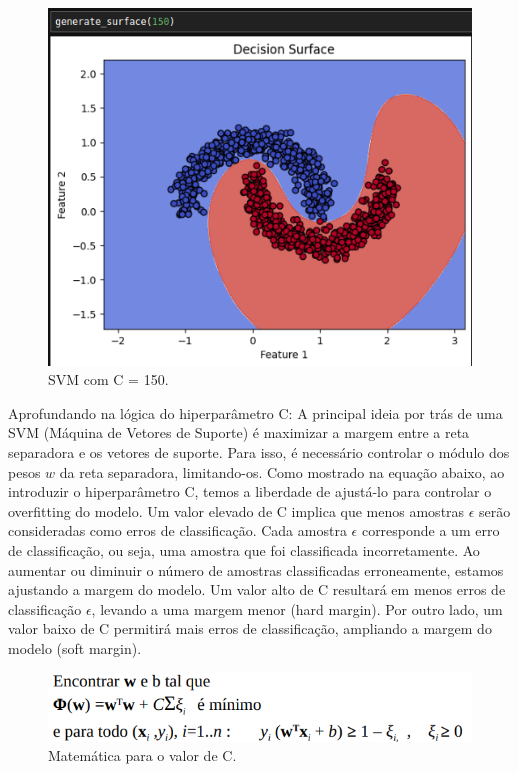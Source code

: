 \documentclass{article} %
\begin{document}
\vspace{1cm}

\begin{figure}[h] %
    \centering %
    \includegraphics[width=0.5\linewidth]{svm_c_150.png} %
    \caption{SVM com C = 150.} %
    \label{fig:exemplo} %
\end{figure}

\vspace{1cm}

Aprofundando na lógica do hiperparâmetro C: A principal ideia por trás de uma SVM (Máquina de Vetores de Suporte) é maximizar a margem entre a reta separadora e os vetores de suporte. Para isso, é necessário controlar o módulo dos pesos \( w \) da reta separadora, limitando-os. Como mostrado na equação abaixo, ao introduzir o hiperparâmetro C, temos a liberdade de ajustá-lo para controlar o overfitting do modelo. Um valor elevado de C implica que menos amostras \( \epsilon \) serão consideradas como erros de classificação. Cada amostra \( \epsilon \) corresponde a um erro de classificação, ou seja, uma amostra que foi classificada incorretamente. Ao aumentar ou diminuir o número de amostras classificadas erroneamente, estamos ajustando a margem do modelo. Um valor alto de C resultará em menos erros de classificação \( \epsilon \), levando a uma margem menor (hard margin). Por outro lado, um valor baixo de C permitirá mais erros de classificação, ampliando a margem do modelo (soft margin).

\vspace{1cm}

\begin{figure}[h] %
    \centering %
    \includegraphics[width=0.75\linewidth]{math_svm.png} %
    \caption{Matemática para o valor de C.} %
    \label{fig:exemplo} %
\end{figure}
\end{document}
